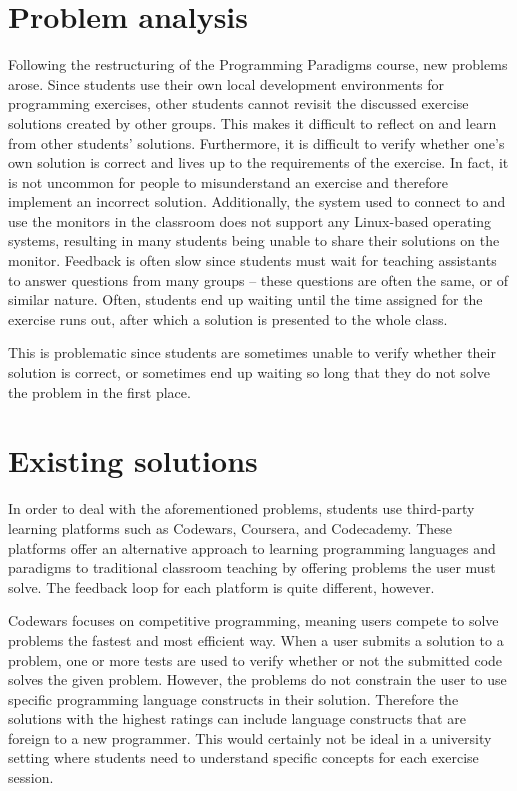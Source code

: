 \section{Problem analysis}
Following the restructuring of the Programming Paradigms course, new problems arose.
Since students use their own local development environments for programming exercises, other students cannot revisit the discussed exercise solutions created by other groups.
This makes it difficult to reflect on and learn from other students' solutions.
Furthermore, it is difficult to verify whether one's own solution is correct and lives up to the requirements of the exercise.
In fact, it is not uncommon for people to misunderstand an exercise and therefore implement an incorrect solution.
Additionally, the system used to connect to and use the monitors in the classroom does not support any Linux-based operating systems, resulting in many students being unable to share their solutions on the monitor.
Feedback is often slow since students must wait for teaching assistants to answer questions from many groups -- these questions are often the same, or of similar nature.
Often, students end up waiting until the time assigned for the exercise runs out, after which a solution is presented to the whole class.

This is problematic since students are sometimes unable to verify whether their solution is correct, or sometimes end up waiting so long that they do not solve the problem in the first place.

\section{Existing solutions}
In order to deal with the aforementioned problems, students use third-party learning platforms such as Codewars\cite{Codewars}, Coursera\cite{Coursera}, and Codecademy\cite{Codecademy}.
These platforms offer an alternative approach to learning programming languages and paradigms to traditional classroom teaching by offering problems the user must solve.
The feedback loop for each platform is quite different, however.


Codewars focuses on competitive programming, meaning users compete to solve problems the fastest and most efficient way.
When a user submits a solution to a problem, one or more tests are used to verify whether or not the submitted code solves the given problem. 
However, the problems do not constrain the user to use specific programming language constructs in their solution.
Therefore the solutions with the highest ratings can include language constructs that are foreign to a new programmer. 
This would certainly not be ideal in a university setting where students need to understand specific concepts for each exercise session.


